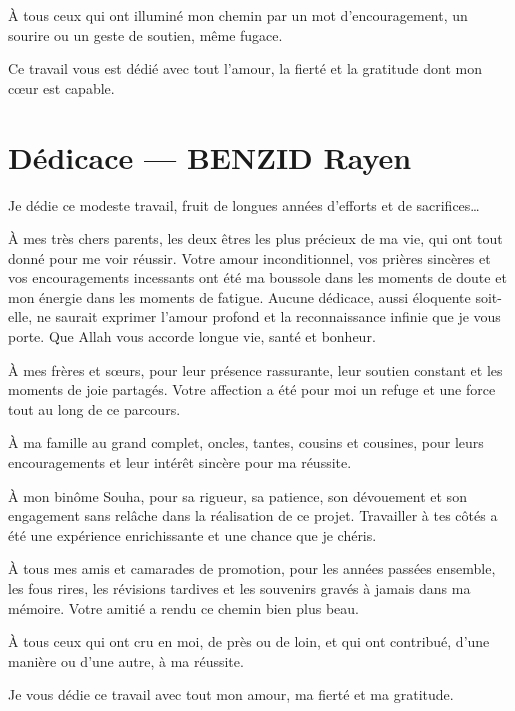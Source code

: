 \documentclass[a4paper,12pt]{report}
\begin{document}
À tous ceux qui ont illuminé mon chemin par un mot d'encouragement, un sourire ou un geste de soutien, même fugace.

Ce travail vous est dédié avec tout l'amour, la fierté et la gratitude dont mon cœur est capable.

\vspace{1cm}
\newpage

\section*{Dédicace — BENZID Rayen}

Je dédie ce modeste travail, fruit de longues années d'efforts et de sacrifices…

À mes très chers parents, les deux êtres les plus précieux de ma vie, qui ont tout donné pour me voir réussir. Votre amour inconditionnel, vos prières sincères et vos encouragements incessants ont été ma boussole dans les moments de doute et mon énergie dans les moments de fatigue. Aucune dédicace, aussi éloquente soit-elle, ne saurait exprimer l'amour profond et la reconnaissance infinie que je vous porte. Que Allah vous accorde longue vie, santé et bonheur.

À mes frères et sœurs, pour leur présence rassurante, leur soutien constant et les moments de joie partagés. Votre affection a été pour moi un refuge et une force tout au long de ce parcours.

À ma famille au grand complet, oncles, tantes, cousins et cousines, pour leurs encouragements et leur intérêt sincère pour ma réussite.

À mon binôme Souha, pour sa rigueur, sa patience, son dévouement et son engagement sans relâche dans la réalisation de ce projet. Travailler à tes côtés a été une expérience enrichissante et une chance que je chéris.

À tous mes amis et camarades de promotion, pour les années passées ensemble, les fous rires, les révisions tardives et les souvenirs gravés à jamais dans ma mémoire. Votre amitié a rendu ce chemin bien plus beau.

À tous ceux qui ont cru en moi, de près ou de loin, et qui ont contribué, d'une manière ou d'une autre, à ma réussite.

Je vous dédie ce travail avec tout mon amour, ma fierté et ma gratitude.

\newpage

\end{document}
